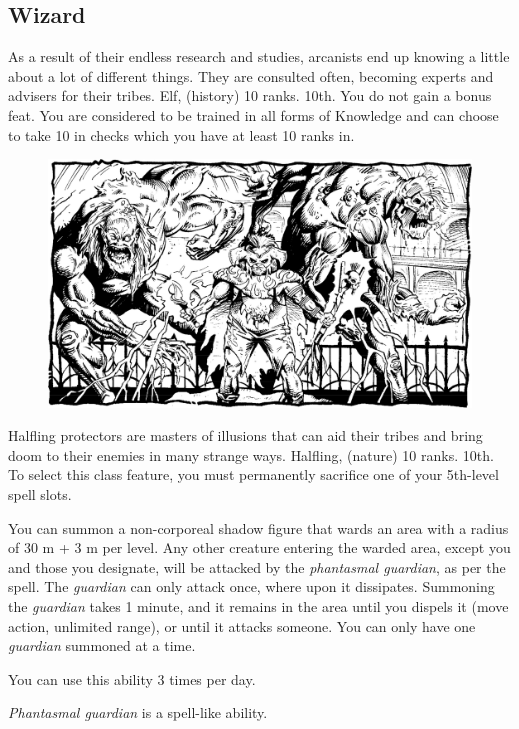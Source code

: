 \subsection{Wizard}
{As a result of their endless research and studies, arcanists end up knowing a little about a lot of different things. They are consulted often, becoming experts and advisers for their tribes.}
{Elf,  (history) 10 ranks.}
{10th.}
{You do not gain a bonus feat.}
{
	You are considered to be trained in all forms of Knowledge and can choose to take 10 in  checks which you have at least 10 ranks in.
}

\begin{figure}[t!]
\centering
\includegraphics[width=\textwidth]{images/necromancer-1.png}
\WOTC
\end{figure}
{Halfling protectors are masters of illusions that can aid their tribes and bring doom to their enemies in many strange ways.}
{Halfling,  (nature) 10 ranks.}
{10th.}
{To select this class feature, you must permanently sacrifice one of your 5th-level spell slots.}
{
	You can summon a non-corporeal shadow figure that wards an area with a radius of 30 m + 3 m per level. Any other creature entering the warded area, except you and those you designate, will be attacked by the \emph{phantasmal guardian}, as per the  spell. The \emph{guardian} can only attack once, where upon it dissipates. Summoning the \emph{guardian} takes 1 minute, and it remains in the area until you dispels it (move action, unlimited range), or until it attacks someone. You can only have one \emph{guardian} summoned at a time.

	You can use this ability 3 times per day.

	\emph{Phantasmal guardian} is a spell-like ability.
}
